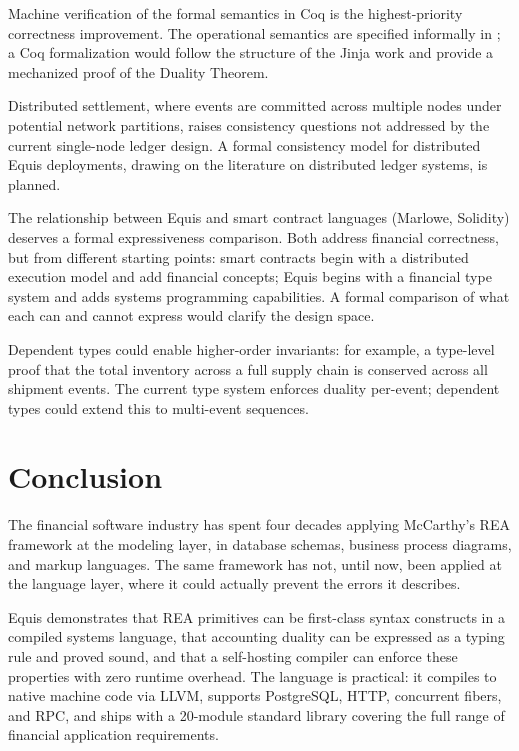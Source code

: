 \documentclass[11pt,a4paper]{article}
\theoremstyle{remark}
\begin{document}
Machine verification of the formal semantics in Coq is the
highest-priority correctness improvement. The operational semantics
are specified informally in ; a Coq formalization
would follow the structure of the Jinja work
\citep{klein_machine-checked_2006} and provide a mechanized proof of the
Duality Theorem.

Distributed settlement, where events are committed across multiple
nodes under potential network partitions, raises consistency questions
not addressed by the current single-node ledger design. A formal
consistency model for distributed Equis deployments, drawing on the
literature on distributed ledger systems, is planned.

The relationship between Equis and smart contract languages (Marlowe,
Solidity) deserves a formal expressiveness comparison. Both address
financial correctness, but from different starting points: smart
contracts begin with a distributed execution model and add financial
concepts; Equis begins with a financial type system and adds systems
programming capabilities. A formal comparison of what each can and
cannot express would clarify the design space.

Dependent types could enable higher-order invariants: for example, a
type-level proof that the total inventory across a full supply chain
is conserved across all shipment events. The current type system
enforces duality per-event; dependent types could extend this to
multi-event sequences.

\section{Conclusion}\label{sec:conclusion}

The financial software industry has spent four decades applying
McCarthy's REA framework at the modeling layer, in database schemas,
business process diagrams, and markup languages. The same framework
has not, until now, been applied at the language layer, where it could
actually prevent the errors it describes.

Equis demonstrates that REA primitives can be first-class syntax
constructs in a compiled systems language, that accounting duality
can be expressed as a typing rule and proved sound, and that a
self-hosting compiler can enforce these properties with zero runtime
overhead. The language is practical: it compiles to native machine
code via LLVM, supports PostgreSQL, HTTP, concurrent fibers, and RPC,
and ships with a 20-module standard library covering the full range
of financial application requirements.
\end{document}
